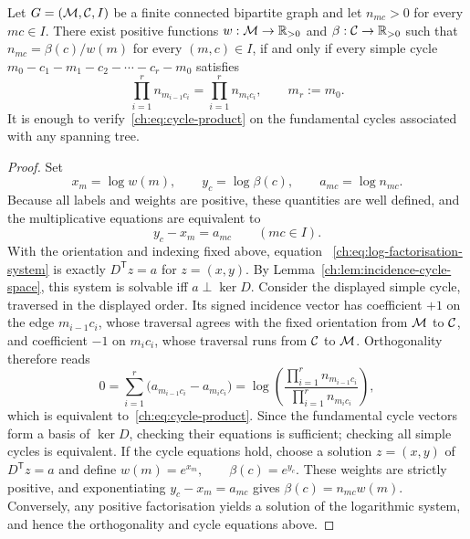 \begin{theorem}\label{ch:thm:cycle-factorisation}
Let $G=(\mathcal{M},\mathcal{C},I)$ be a finite connected bipartite graph and let
$n_{mc}>0$ for every $mc\in I$.  There exist positive functions
$w:\mathcal{M}\to\mathbb R_{>0}$ and $\beta:\mathcal{C}\to\mathbb R_{>0}$ such that $n_{mc}=\beta(c)/w(m)$ for every $(m,c)\in I$, if and only if every simple cycle $m_0-c_1-m_1-c_2-\cdots-c_r-m_0$ satisfies
\begin{equation}\label{ch:eq:cycle-product}
 \prod_{i=1}^{r}n_{m_{i-1}c_i}
 =
 \prod_{i=1}^{r}n_{m_i c_i},
 \qquad m_r:=m_0.
\end{equation}
It is enough to verify~\eqref{ch:eq:cycle-product} on the fundamental
cycles associated with any spanning tree.
\end{theorem}
\begin{proof}
Set
\[
 x_m=\log w(m),\qquad y_c=\log\beta(c),\qquad
 a_{mc}=\log n_{mc}.
\]
Because all labels and weights are positive, these quantities are
well defined, and the multiplicative equations are equivalent to
\begin{equation}\label{ch:eq:log-factorisation-system}
 y_c-x_m=a_{mc}\qquad(mc\in I).
\end{equation}
With the orientation and indexing fixed above, equation
~\eqref{ch:eq:log-factorisation-system} is exactly
$D^{\mathsf T}z=a$ for $z=(x,y)$.
By Lemma~\ref{ch:lem:incidence-cycle-space}, this system is solvable iff
$a\perp\ker D$.  Consider the displayed simple cycle, traversed in the
displayed order.  Its signed incidence vector has coefficient $+1$ on
the edge $m_{i-1}c_i$, whose traversal agrees with the fixed orientation
from $\mathcal{M}$ to $\mathcal{C}$, and coefficient $-1$ on $m_ic_i$, whose
traversal runs from $\mathcal{C}$ to $\mathcal{M}$.  Orthogonality therefore reads
\[
 0=\sum_{i=1}^{r}
 \bigl(a_{m_{i-1}c_i}-a_{m_ic_i}\bigr)
 =\log\!\left(
 \frac{\prod_{i=1}^{r}n_{m_{i-1}c_i}}
      {\prod_{i=1}^{r}n_{m_ic_i}}
 \right),
\]
which is equivalent to~\eqref{ch:eq:cycle-product}.  Since the fundamental
cycle vectors form a basis of $\ker D$, checking their equations is
sufficient; checking all simple cycles is equivalent.
If the cycle equations hold, choose a solution $z=(x,y)$ of
$D^{\mathsf T}z=a$ and define $w(m)=e^{x_m},\qquad \beta(c)=e^{y_c}.$ These weights are strictly positive, and exponentiating
$y_c-x_m=a_{mc}$ gives $\beta(c)=n_{mc}w(m)$.  Conversely, any positive
factorisation yields a solution of the logarithmic system, and hence
the orthogonality and cycle equations above.
\end{proof}

